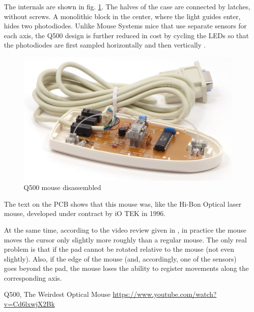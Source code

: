 \documentclass[11pt, a4paper]{article}
\begin{document}
The internals are shown in fig. \ref{fig:q500mouseInside}.
The halves of the case are connected by latches, without screws. A monolithic block in the center, where the light guides enter, hides two photodiodes. Unlike Mouse Systems mice that use separate sensors for each axis, the Q500 design is further reduced in cost by cycling the LEDs so that the photodiodes are first sampled horizontally and then vertically \cite{yq}.

\begin{figure}[h]
    \centering
    \includegraphics[scale=0.8]{1996_q500_mouse/inside_30.jpg}
    \caption{Q500 mouse disassembled}
    \label{fig:q500mouseInside}
\end{figure}

The text on the PCB shows that this mouse was, like the Hi-Bon Optical laser mouse, developed under contract by iO TEK in 1996.

At the same time, according to the video review given in \cite{yq}, in practice the mouse moves the cursor only slightly more roughly than a regular mouse. The only real problem is that if the pad cannot be rotated relative to the mouse (not even slightly). Also, if the edge of the mouse (and, accordingly, one of the sensors) goes beyond the pad, the mouse loses the ability to register movements along the corresponding axis.

\begin{thebibliography}{9}
 Q500, The Weirdest Optical Mouse \url{https://www.youtube.com/watch?v=Cd6lxwjX2Bk}
\end{thebibliography}
\end{document}
